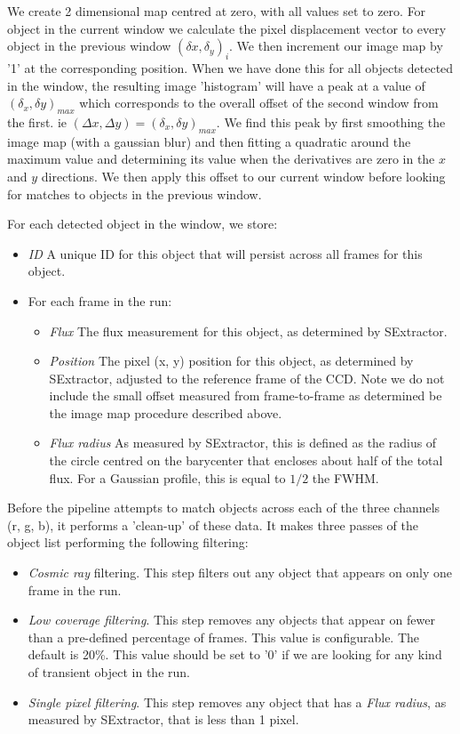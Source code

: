 We create 2 dimensional map centred at zero, with all values set to zero. For object in the current window we calculate the pixel displacement vector to every object in the previous window $(\delta x, \delta_y)_i$.  We then increment our image map by '1' at the corresponding position. When we have done this for all objects detected in the window, the resulting image 'histogram' will have a peak at a value of $(\delta_x, \delta y)_{max}$ which corresponds to the overall offset of the second window from the first. ie $(\Delta x, \Delta y) = (\delta_x, \delta y)_{max}$. We find this peak by first smoothing the image map (with a gaussian blur) and then fitting a quadratic around the maximum value and determining its value when the derivatives are zero in the $x$ and $y$ directions. We then apply this offset to our current window before looking for matches to objects in the previous window.

For each detected object in the window, we store: 
\begin{itemize}
  \item \emph{ID} A unique ID for this object that will persist across all frames for this object.
  \item For each frame in the run:
  \begin{itemize}
    \item \emph{Flux} The flux measurement for this object, as determined by SExtractor.
    \item \emph{Position} The pixel (x, y) position for this object, as determined by SExtractor, adjusted to the reference frame of the CCD. Note we do not include the small offset measured from frame-to-frame as determined be the image map procedure described above. 
    \item \emph{Flux radius} As measured by SExtractor, this is defined as the radius of the circle centred on the barycenter that encloses about half of the total flux. For a Gaussian profile, this is equal to $1/2$ the FWHM. 
  \end{itemize}
\end{itemize}

Before the pipeline attempts to match objects across each of the three channels (r, g, b), it performs a 'clean-up' of these data. It makes three passes of the object list performing the following filtering:

\begin{itemize}
  \item \emph{Cosmic ray} filtering. This step filters out any object that appears on only one frame in the run. 
  \item \emph{Low coverage filtering}. This step removes any objects that appear on fewer than a pre-defined percentage of frames. This value is configurable. The default is 20\%. This value should be set to '0' if we are looking for any kind of transient object in the run. 
  \item \emph{Single pixel filtering}. This step removes any object that has a \emph{Flux radius}, as measured by SExtractor, that is less than 1 pixel.
\end{itemize}

